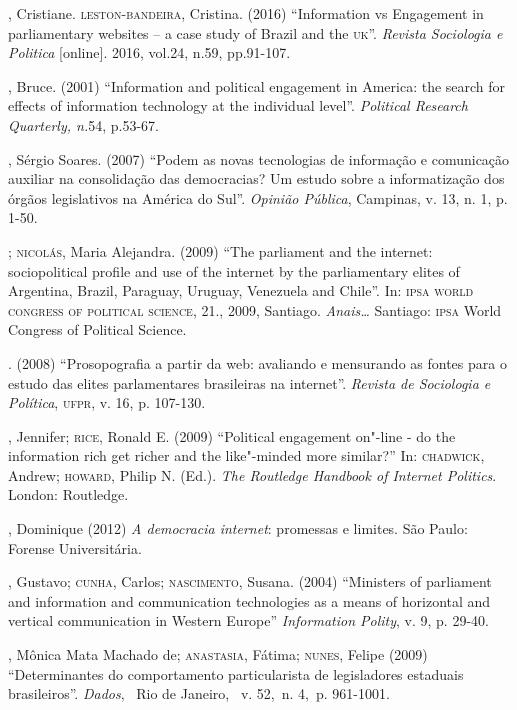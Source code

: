 \begin{bibliohedra}
, Cristiane. \textsc{leston}-\textsc{bandeira}, Cristina. (2016) ``Information vs
Engagement in parliamentary websites -- a case study of Brazil and the
\textsc{uk}''. \emph{Revista Sociologia e Politica} {[}online{]}. 2016, vol.24,
n.59, pp.91-107.

, Bruce. (2001) ``Information and political engagement in America:
the search for effects of information technology at the individual
level''. \emph{Political Research Quarterly, n.}54, p.53-67.

, Sérgio Soares. (2007) ``Podem as novas tecnologias de informação
e comunicação auxiliar na consolidação das democracias? Um estudo sobre
a informatização dos órgãos legislativos na América do Sul''.
\emph{Opinião Pública}, Campinas, v. 13, n. 1, p. 1-50.

\titidem; \textsc{nicolás}, Maria Alejandra. (2009) ``The parliament and the
internet: sociopolitical profile and use of the internet by the
parliamentary elites of Argentina, Brazil, Paraguay, Uruguay, Venezuela
and Chile''. In: \textsc{ipsa world congress of political science}, 21., 2009,
Santiago. \emph{Anais\ldots{}} Santiago: \textsc{ipsa} World Congress of Political
Science.

\titidem. (2008) ``Prosopografia a partir
da web: avaliando e mensurando as fontes para o estudo das elites
parlamentares brasileiras na internet''. \emph{Revista de Sociologia e
Política}, \textsc{ufpr}, v. 16, p. 107-130.

, Jennifer; \textsc{rice}, Ronald E. (2009) ``Political engagement
on"-line - do the information rich get richer and the like"-minded more
similar?'' In: \textsc{chadwick}, Andrew; \textsc{howard}, Philip N. (Ed.). \emph{The
Routledge Handbook of Internet Politics}. London: Routledge.

, Dominique (2012) \emph{A democracia internet}: promessas e
limites. São Paulo: Forense Universitária.

, Gustavo; \textsc{cunha}, Carlos; \textsc{nascimento}, Susana. (2004) ``Ministers
of parliament and information and communication technologies as a means
of horizontal and vertical communication in Western Europe''
\emph{Information Polity}, v. 9, p. 29-40.

, Mônica Mata Machado de; \textsc{anastasia}, Fátima; \textsc{nunes}, Felipe (2009)
``Determinantes do comportamento particularista de legisladores
estaduais brasileiros''. \emph{Dados},~ Rio de Janeiro,~ v. 52,~n. 4,~p.
961-1001.


\end{bibliohedra}
